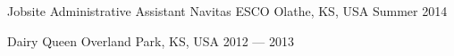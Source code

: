 \begin{cventries}
\cventry
	{Jobsite Administrative Assistant} %
	{Navitas ESCO} %
	{Olathe, KS, USA} %
	{Summer 2014} %
	{}

\cventry
	{} %
	{Dairy Queen} %
	{Overland Park, KS, USA} %
	{2012 --- 2013} %
	{}
\end{cventries}